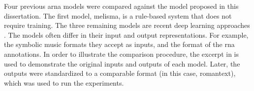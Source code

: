 
Four previous \gls{arna} models were compared against the
model proposed in this dissertation. The first model,
\gls{melisma}, is a rule-based system that does not require
training. The three remaining models are recent deep
learning approaches \parencite{chen2021attend,
micchi2021deep, mcleod2021modular}. The models often differ
in their input and output representations. For example, the
symbolic music formats they accept as inputs, and the format
of the \gls{rna} annotations. In order to illustrate the
comparison procedure, the excerpt in  is
used to demonstrate the original inputs and outputs of each
model. Later, the outputs were standardized to a comparable
format (in this case, \gls{romantext}), which was used to run
the experiments.

